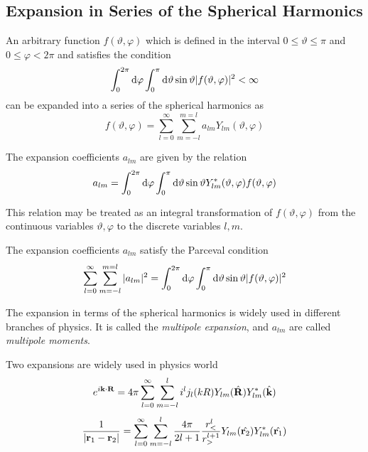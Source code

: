 \subsection[Expansion in Series ...]{Expansion in Series of the Spherical Harmonics}
%
\par{An arbitrary function $f(\vartheta,\varphi)$ which is defined in the interval $0\le \vartheta \le
\pi$ and $0\le \varphi <2\pi$ and satisfies the condition}
\begin{equation}
\int_{0}^{2\pi}\text{d} \varphi \int_{0}^{\pi} \text{d} \vartheta \sin \vartheta
|f(\vartheta,\varphi)|^2< \infty
\end{equation} 
can be expanded into a series of the spherical harmonics as
\begin{equation}
\label{multipole}
f(\vartheta,\varphi)=\sum_{l=0}^{\infty}\sum_{m=-l}^{m=l}a_{lm}Y_{lm}(\vartheta,\varphi)
\end{equation}
\par{The expansion coefficients $a_{lm}$ are given by the relation}
\begin{equation}
a_{lm}=\int_{0}^{2\pi}\text{d} \varphi \int_{0}^{\pi} \text{d} \vartheta \sin \vartheta Y_{lm}^{*}(\vartheta,\varphi)f(\vartheta,\varphi)
\end{equation}
\par{This relation may be treated as an integral transformation of
$f(\vartheta,\varphi)$ from the continuous variables $\vartheta,\varphi$ to
the discrete variables $l,m$.}
\par{The expansion coefficients $a_{lm}$ satisfy the Parceval condition}
\begin{equation}
\sum_{l=0}^{\infty}\sum_{m=-l}^{m=l}|a_{lm}|^2=\int_{0}^{2\pi}\text{d} \varphi
\int_{0}^{\pi} \text{d} \vartheta \sin \vartheta |f(\vartheta,\varphi)|^2
\end{equation}
\par{The expansion  in terms of the spherical harmonics is
  widely used in different branches of physics. It is called the {\it
  multipole expansion}, and $a_{lm}$ are called {\it multipole moments}.}
\par{Two expansions are widely used in physics world}
\begin{equation}
\label{cwave}
e^{i{\bf k}\cdot {\bf R}}=4\pi
\sum_{l=0}^{\infty}\sum_{m=-l}^{l}i^lj_l(kR)Y_{lm}(\hat{\bf R})Y_{lm}^{*}(\hat{\bf k})
\end{equation}
\begin{equation}
\label{coulomb}
\frac{1}{|{\bf r}_1-{\bf r}_2|}=\sum_{l=0}^{\infty}\sum_{m=-l}^{l}\frac{4 \pi}{2l+1}\frac{r_<^l}{r_>^{l+1}}Y_{lm}(\hat{{\bf r}_2})Y_{lm}^{*}(\hat{{\bf r}_1})
\end{equation}
